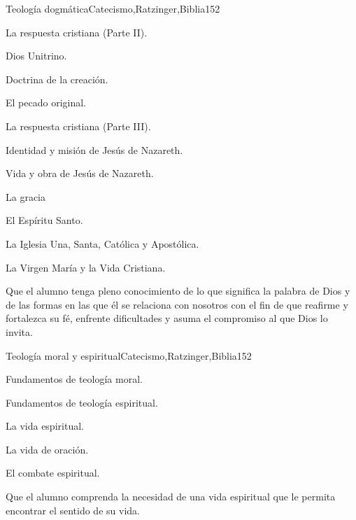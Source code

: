 \begin{syllabus}
\begin{unit}{Teología dogmática}{Catecismo,Ratzinger,Biblia}{15}{2}
\begin{topics}
	\item La respuesta cristiana (Parte II). 
	      \begin{inparaenum}
		  \item Dios Unitrino.
		  \item Doctrina de la creación.
		  \item El pecado original.
	      \end{inparaenum}
	 \item La respuesta cristiana (Parte III). 
	      \begin{inparaenum}
		  \item Identidad y misión de Jesús de Nazareth.
		  \item Vida y obra de Jesús de Nazareth.
		  \item La gracia
		  \item El Espíritu Santo.
		  \item La Iglesia Una, Santa, Católica y Apostólica.
		  \item La Virgen María y la Vida Cristiana.
	      \end{inparaenum}
\end{topics}
\begin{learningoutcomes}
	\item Que el alumno tenga pleno conocimiento de lo que significa la palabra de Dios y de las formas en las que él se relaciona con nosotros con el fin de que reafirme y fortalezca su fé, enfrente dificultades y asuma el compromiso al que Dios lo invita.
\end{learningoutcomes}
\end{unit}

\begin{unit}{Teología moral y espiritual}{Catecismo,Ratzinger,Biblia}{15}{2}
\begin{topics}
      \item Fundamentos de teología moral.
      \item Fundamentos de teología espiritual.
      \item La vida espiritual.
      \item La vida de oración.
      \item El combate espiritual.
\end{topics}

\begin{learningoutcomes}
      \item Que el alumno comprenda la necesidad de una vida espiritual que le permita encontrar el sentido de su vida.
\end{learningoutcomes}
\end{unit}



\begin{coursebibliography}
\end{coursebibliography}

\end{syllabus}

